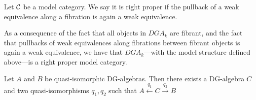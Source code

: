 \begin{definition}
\label{def:right_proper}
Let $\mathcal{C}$ be a model category. We say it is right proper if the pullback of a weak equivalence along a fibration is again a weak equivalence. 
\end{definition}

As a consequence of the fact that all objects in $DGA_k$ are fibrant, and the fact that pullbacks of weak equivalences along fibrations between fibrant objects is again a weak equivalence, we have that $DGA_k$---with the model structure defined above---is a right proper model category.  

\begin{theorem}
\label{thm:span}
Let $A$ and $B$ be quasi-isomorphic DG-algebras. Then there exists a DG-algebra $C$ and two quasi-isomorphisms $q_1, q_2$ such that $A\overset{q_1}\longleftarrow C \overset{q_2}\longrightarrow B$
\end{theorem}
